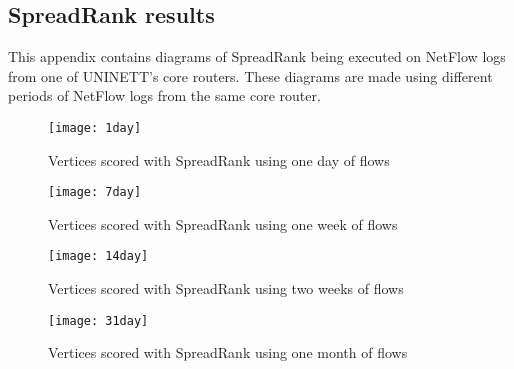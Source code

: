 \begin{landscape}
\chapter{SpreadRank results}
\label{chp:diagrams}

This appendix contains diagrams of SpreadRank being executed on NetFlow logs from one of UNINETT's core routers.
These diagrams are made using different periods of NetFlow logs from the same core router.

\begin{figure}[h]
	\caption{Vertices scored with SpreadRank using one day of flows}
	\centering
		\texttt{[image: 1day]}
\end{figure}
\begin{figure}[h]
	\caption{Vertices scored with SpreadRank using one week of flows}
	\centering
		\texttt{[image: 7day]}
\end{figure}
\begin{figure}[h]
	\caption{Vertices scored with SpreadRank using two weeks of flows}
	\centering
		\texttt{[image: 14day]}
\end{figure}
\begin{figure}[h]
	\caption{Vertices scored with SpreadRank using one month of flows}
	\centering
		\texttt{[image: 31day]}
\end{figure}
\end{landscape}
